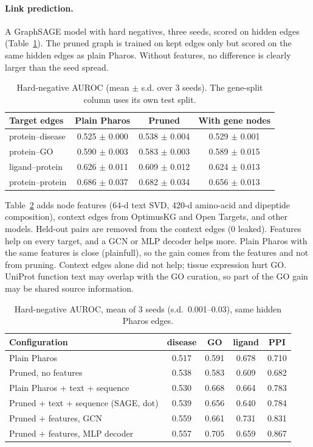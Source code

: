 \documentclass[11pt]{article}
\begin{document}
\paragraph{Link prediction.} A GraphSAGE model \cite{sage} with hard negatives, three seeds, scored on hidden edges (Table~\ref{tab:lp}). The pruned graph is trained on kept edges only but scored on the same hidden edges as plain Pharos. Without features, no difference is clearly larger than the seed spread.
\begin{table}[h]\centering\small
\begin{tabular}{@{}lccc@{}}\toprule
Target edges & Plain Pharos & Pruned & With gene nodes\\\midrule
protein--disease & 0.525 $\pm$ 0.000 & 0.538 $\pm$ 0.004 & 0.529 $\pm$ 0.001\\
protein--GO & 0.590 $\pm$ 0.003 & 0.583 $\pm$ 0.003 & 0.589 $\pm$ 0.015\\
ligand--protein & 0.626 $\pm$ 0.011 & 0.609 $\pm$ 0.012 & 0.624 $\pm$ 0.013\\
protein--protein & 0.686 $\pm$ 0.037 & 0.682 $\pm$ 0.034 & 0.656 $\pm$ 0.013\\\bottomrule
\end{tabular}
\caption{Hard-negative AUROC (mean $\pm$ s.d. over 3 seeds). The gene-split column uses its own test split.}\label{tab:lp}
\end{table}


Table~\ref{tab:lp2} adds node features (64-d text SVD, 420-d amino-acid and dipeptide composition), context edges from OptimusKG and Open Targets, and other models. Held-out pairs are removed from the context edges (0 leaked). Features help on every target, and a GCN or MLP decoder helps more. Plain Pharos with the same features is close (plainfull), so the gain comes from the features and not from pruning. Context edges alone did not help; tissue expression hurt GO. UniProt function text may overlap with the GO curation, so part of the GO gain may be shared source information.
\begin{table}[h]\centering\small
\begin{tabular}{@{}lcccc@{}}\toprule
Configuration & disease & GO & ligand & PPI\\\midrule
Plain Pharos & 0.517 & 0.591 & 0.678 & 0.710\\
Pruned, no features & 0.538 & 0.583 & 0.609 & 0.682\\
Plain Pharos + text + sequence & 0.530 & 0.668 & 0.664 & 0.783\\
Pruned + text + sequence (SAGE, dot) & 0.539 & 0.656 & 0.640 & 0.784\\
Pruned + features, GCN & 0.559 & 0.661 & 0.731 & 0.831\\
Pruned + features, MLP decoder & 0.557 & 0.705 & 0.659 & 0.867\\\bottomrule
\end{tabular}
\caption{Hard-negative AUROC, mean of 3 seeds (s.d.\ 0.001--0.03), same hidden Pharos edges.}\label{tab:lp2}
\end{table}
\end{document}
